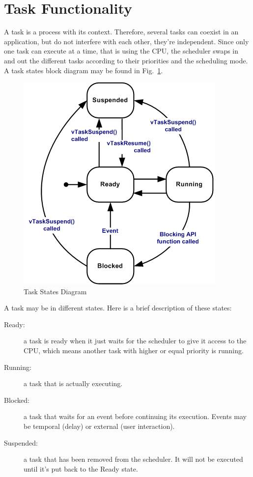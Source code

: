 \documentclass[11pt]{report}
\begin{document}
\section{Task Functionality}
A task is a process with its context. Therefore, several tasks can coexist in an application, but do not interfere with each other, they're independent. Since only one task can execute at a time, that is using the CPU, the scheduler swaps in and out the different tasks according to their priorities and the scheduling mode. A task states block diagram may be found in Fig.~\ref{task_diagram}.

\begin{figure}
\begin{center}
\includegraphics[scale=0.5]{figures/tskstate.png}
\end{center}
\caption{Task States Diagram}
\label{task_diagram}
\end{figure}

A task may be in different states. Here is a brief description of these states:
\begin{description}
	\item[Ready:] a task is ready when it just waits for the scheduler to give it access to the CPU, which means another task with higher or equal priority is running.
	\item[Running:] a task that is actually executing.
	\item[Blocked:] a task that waits for an event before continuing its execution. Events may be temporal (delay) or external (user interaction).
	\item[Suspended:] a task that has been removed from the scheduler. It will not be executed until it's put back to the Ready state.
\end{description}
\end{document}
